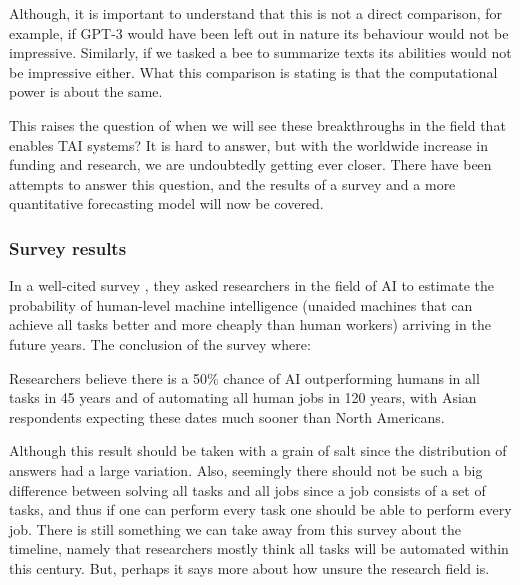 \documentclass[12pt,A4]{report}
\theoremstyle{definition}
\begin{document}
Although, it is important to understand that this is not a direct comparison, for example, if GPT-3 would have been left out in nature its behaviour would not be impressive. Similarly, if we tasked a bee to summarize texts its abilities would not be impressive either. What this comparison is stating is that the computational power is about the same. 

This raises the question of when we will see these breakthroughs in the field that enables TAI systems? It is hard to answer, but with the worldwide increase in funding and research, we are undoubtedly getting ever closer. There have been attempts to answer this question, and the results of a survey and a more quantitative forecasting model will now be covered. 

\subsubsection{Survey results}
In a well-cited survey \citet{Grace}, they asked researchers in the field of AI to estimate the probability of human-level machine intelligence (unaided machines that can achieve all tasks better and more cheaply than human workers) arriving in the future years. The conclusion of the survey where:
\begin{displayquote}
Researchers believe there is a 50\% chance of AI outperforming humans in all tasks in 45 years and of automating all human jobs in 120 years, with Asian respondents expecting these dates much sooner than North Americans.
\end{displayquote}
Although this result should be taken with a grain of salt since the distribution of answers had a large variation. Also, seemingly there should not be such a big difference between solving all tasks and all jobs since a job consists of a set of tasks, and thus if one can perform every task one should be able to perform every job. There is still something we can take away from this survey about the timeline, namely that researchers mostly think all tasks will be automated within this century. But, perhaps it says more about how unsure the research field is. 
\end{document}
